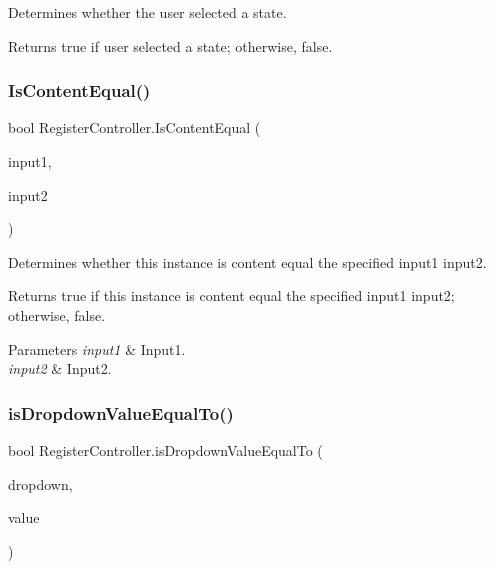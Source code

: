 Determines whether the user selected a state. 

\begin{DoxyReturn}{Returns}
{\ttfamily true} if user selected a state; otherwise, {\ttfamily false}.
\end{DoxyReturn}
\mbox{\label{classRegisterController_a7728cb73673b72b2fa059200a9cbc4af}} 
\subsubsection{\texorpdfstring{Is\+Content\+Equal()}{IsContentEqual()}}
{\footnotesize\ttfamily bool Register\+Controller.\+Is\+Content\+Equal (\begin{DoxyParamCaption}\item[{Input\+Field}]{input1,  }\item[{Input\+Field}]{input2 }\end{DoxyParamCaption})\hspace{0.3cm}{\ttfamily [inline]}}



Determines whether this instance is content equal the specified input1 input2. 

\begin{DoxyReturn}{Returns}
{\ttfamily true} if this instance is content equal the specified input1 input2; otherwise, {\ttfamily false}.
\end{DoxyReturn}

\begin{DoxyParams}{Parameters}
{\em input1} & Input1.\\
\hline
{\em input2} & Input2.\\
\hline
\end{DoxyParams}
\mbox{\label{classRegisterController_a35307b8660a21bbf7a186878a50c1082}} 
\subsubsection{\texorpdfstring{is\+Dropdown\+Value\+Equal\+To()}{isDropdownValueEqualTo()}}
{\footnotesize\ttfamily bool Register\+Controller.\+is\+Dropdown\+Value\+Equal\+To (\begin{DoxyParamCaption}\item[{Dropdown}]{dropdown,  }\item[{string}]{value }\end{DoxyParamCaption})\hspace{0.3cm}{\ttfamily [inline]}}



